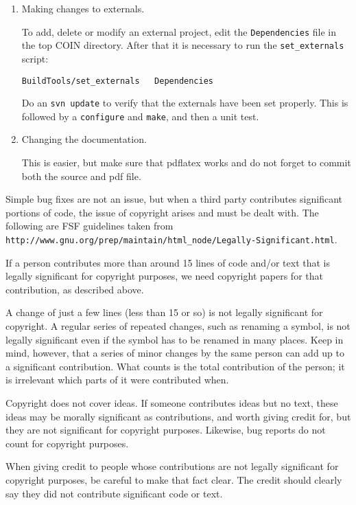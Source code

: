 \begin{enumerate}
\item Making changes to externals.

To add, delete or modify an external project, edit the {\tt Dependencies} file in the top COIN directory.
After that it is necessary to run the {\tt set\_externals} script:

\begin{verbatim}
BuildTools/set_externals   Dependencies
\end{verbatim}

Do an {\tt svn update} to verify that the externals have been set properly.
This is followed by a  {\tt configure} and {\tt make}, and then a unit test. 

\item Changing the documentation.

This is easier, but make sure that pdflatex works and do not forget to commit both the source and pdf file. 

\end{enumerate}

\label{section:significantChanges}

Simple bug fixes are not an issue, but when a third party contributes significant portions of code, the issue of copyright arises and must be dealt with. The following are FSF guidelines taken from 
{\tt http://www.gnu.org/prep/maintain/html\_node/Legally-Significant.html}.

If a person contributes more than around 15 lines of code and/or text that is legally significant for copyright purposes, we need copyright papers for that contribution, as described above.
 
A change of just a few lines (less than 15 or so) is not legally significant for copyright. A regular series of repeated changes, such as renaming a symbol, is not legally significant even if the symbol has to be renamed in many places. Keep in mind, however, that a series of minor changes by the same person can add up to a significant contribution. What counts is the total contribution of the person; it is irrelevant which parts of it were contributed when.
 
Copyright does not cover ideas. If someone contributes ideas but no text, these ideas may be morally significant as contributions, and worth giving credit for, but they are not significant for copyright purposes. Likewise, bug reports do not count for copyright purposes.
 
When giving credit to people whose contributions are not legally significant for copyright purposes, be careful to make that fact clear. The credit should clearly say they did not contribute significant code or text.
 
